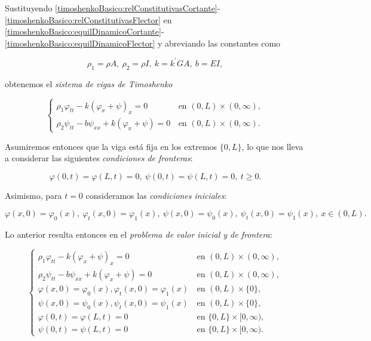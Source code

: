 Sustituyendo \eqref{timoshenkoBasico:relConstitutivasCortante}-\eqref{timoshenkoBasico:relConstitutivasFlector} en \eqref{timoshenkoBasico:equilDinamicoCortante}-\eqref{timoshenkoBasico:equilDinamicoFlector} y abreviando las constantes como

\[\rho_1 = \rho A, \ \rho_2 = \rho I, \ k = k^{\prime}GA, \ b = EI,\]

obtenemos el \textit{sistema de vigas de Timoshenko}

\begin{equation}
\label{eqTimoshenkoBasico}
\begin{cases}
\rho_1 \varphi_{tt} - k(\varphi_x + \psi)_x = 0 \, &\text{en } (0,L) \times (0, \infty),\\
\rho_2 \psi_{tt} - b\psi_{xx} + k(\varphi_x + \psi) = 0 \, &\text{en } (0,L) \times (0, \infty).
\end{cases}
\end{equation}

Asumiremos entonces que la viga está fija en los extremos $\{0,L\}$, lo que nos lleva a considerar las siguientes \textit{condiciones de fronteras}:

\[\varphi(0,t) = \varphi(L,t) = 0, \ \psi(0,t) = \psi(L,t) = 0, \ t \geq 0.\]

Asimismo, para $t = 0$ consideramos las \textit{condiciones iniciales}:

\[\varphi(x,0) = \varphi_0(x), \ \varphi_t(x,0) = \varphi_1(x), \ \psi(x,0) = \psi_0(x), \ \psi_t(x,0) = \psi_1(x), \ x \in (0, L).\]

Lo anterior resulta entonces en el \textit{problema de valor inicial y de frontera}:

\begin{equation}
\label{pviTimoshenkoBasico}
\begin{cases}
\rho_1 \varphi_{tt} - k(\varphi_x + \psi)_x = 0 \, &\text{en } (0,L) \times (0, \infty),\\
\rho_2 \psi_{tt} - b\psi_{xx} + k(\varphi_x + \psi) = 0 \, &\text{en } (0,L) \times (0, \infty), \\
\varphi(x,0) = \varphi_0(x), \varphi_t(x,0) = \varphi_1(x) \, &\text{en } (0, L) \times \{0\}, \\
\psi(x,0) = \psi_0(x), \psi_t(x,0) = \psi_1(x) \, &\text{en } (0, L) \times \{0\}, \\
\varphi(0,t) = \varphi(L,t) = 0 \, &\text{en } \{0, L\} \times [0, \infty),\\
\psi(0,t) = \psi(L,t) = 0 \, &\text{en } \{0, L\} \times [0, \infty).
\end{cases}
\end{equation}

